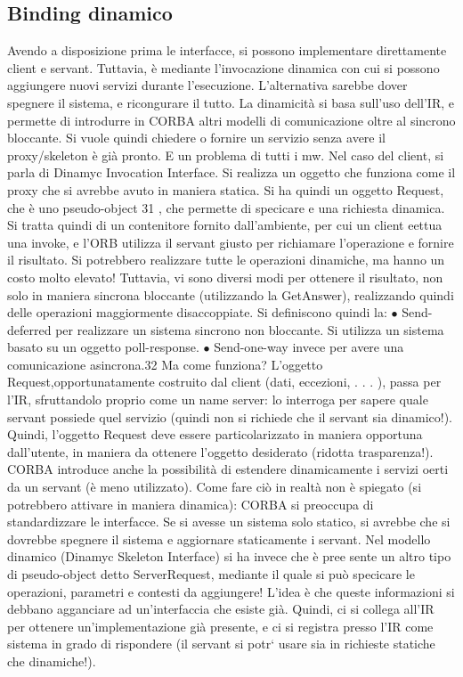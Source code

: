 \subsection{Binding dinamico}
Avendo a disposizione prima le interfacce, si possono implementare direttamente client e servant. Tuttavia, è mediante
l'invocazione dinamica con cui
si possono aggiungere nuovi servizi durante l'esecuzione. L'alternativa sarebbe
dover spegnere il sistema, e ricongurare il tutto. La dinamicità si basa sull'uso
dell'IR, e permette di introdurre in CORBA altri modelli di comunicazione oltre
al sincrono bloccante.
Si vuole quindi chiedere o fornire un servizio senza avere il proxy/skeleton è già pronto. E un problema di tutti i mw.
Nel caso del client, si parla di Dinamyc Invocation Interface. Si realizza un oggetto che funziona come il proxy che si
avrebbe avuto in maniera statica. Si ha quindi un oggetto Request, che è uno pseudo-object 31 , che permette di
specicare e una richiesta dinamica. Si tratta quindi di un contenitore fornito dall'ambiente,
per cui un client eettua una invoke, e l'ORB utilizza il servant giusto per
richiamare l'operazione e fornire il risultato. Si potrebbero realizzare tutte le
operazioni dinamiche, ma hanno un costo molto elevato! Tuttavia, vi sono
diversi modi per ottenere il risultato, non solo in maniera sincrona bloccante
(utilizzando la GetAnswer), realizzando quindi delle operazioni maggiormente
disaccoppiate. Si definiscono quindi la:
$\bullet$ Send-deferred per realizzare un sistema sincrono non bloccante. Si utilizza
un sistema basato su un oggetto poll-response.
$\bullet$ Send-one-way invece per avere una comunicazione asincrona.32
Ma come funziona? L'oggetto Request,opportunatamente costruito dal client
(dati, eccezioni, . . . ), passa per l'IR, sfruttandolo proprio come un name server: lo interroga per sapere quale
servant possiede quel servizio (quindi non si
richiede che il servant sia dinamico!). Quindi, l'oggetto Request deve essere particolarizzato in maniera opportuna
dall'utente, in maniera da ottenere l'oggetto
desiderato (ridotta trasparenza!).
CORBA introduce anche la possibilità di estendere dinamicamente i servizi
oerti da un servant (è meno utilizzato). Come fare ciò in realtà non è spiegato
(si potrebbero attivare in maniera dinamica): CORBA si preoccupa di standardizzare le interfacce. Se si avesse un
sistema solo statico, si avrebbe che si
dovrebbe spegnere il sistema e aggiornare staticamente i servant.
Nel modello dinamico (Dinamyc Skeleton Interface) si ha invece che è pree
sente un altro tipo di pseudo-object detto ServerRequest, mediante il quale si può
specicare le operazioni, parametri e contesti da aggiungere! L'idea è che queste
informazioni si debbano agganciare ad un'interfaccia che esiste già. Quindi, ci
si collega all'IR per ottenere un'implementazione già presente, e ci si registra
presso l'IR come sistema in grado di rispondere (il servant si potr` usare sia in
richieste statiche che dinamiche!).
